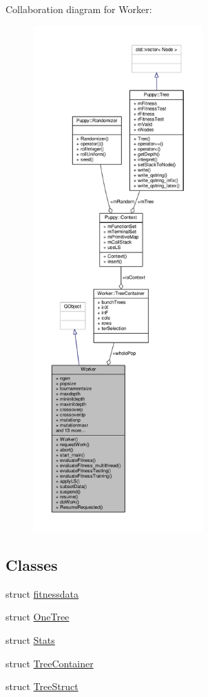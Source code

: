 Collaboration diagram for Worker\+:
\nopagebreak
\begin{figure}[H]
\begin{center}
\leavevmode
\includegraphics[height=550pt]{classWorker__coll__graph}
\end{center}
\end{figure}
\subsection*{Classes}
\begin{DoxyCompactItemize}
\item 
struct \hyperlink{structWorker_1_1fitnessdata}{fitnessdata}
\item 
struct \hyperlink{structWorker_1_1OneTree}{One\+Tree}
\item 
struct \hyperlink{structWorker_1_1Stats}{Stats}
\item 
struct \hyperlink{structWorker_1_1TreeContainer}{Tree\+Container}
\item 
struct \hyperlink{structWorker_1_1TreeStruct}{Tree\+Struct}
\end{DoxyCompactItemize}
